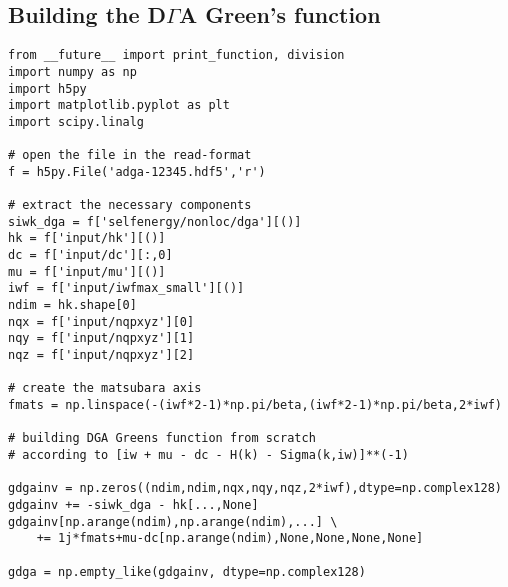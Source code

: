 \documentclass[a4paper,11pt]{article}
\numberwithin{equation}{section} %
\begin{document}
\newpage
\subsection*{Building the D$\Gamma$A Green's function}
\begin{verbatim}
from __future__ import print_function, division
import numpy as np
import h5py
import matplotlib.pyplot as plt
import scipy.linalg

# open the file in the read-format
f = h5py.File('adga-12345.hdf5','r')

# extract the necessary components
siwk_dga = f['selfenergy/nonloc/dga'][()]
hk = f['input/hk'][()]
dc = f['input/dc'][:,0]
mu = f['input/mu'][()]
iwf = f['input/iwfmax_small'][()]
ndim = hk.shape[0]
nqx = f['input/nqpxyz'][0]
nqy = f['input/nqpxyz'][1]
nqz = f['input/nqpxyz'][2]

# create the matsubara axis
fmats = np.linspace(-(iwf*2-1)*np.pi/beta,(iwf*2-1)*np.pi/beta,2*iwf)

# building DGA Greens function from scratch 
# according to [iw + mu - dc - H(k) - Sigma(k,iw)]**(-1)                                                                                               

gdgainv = np.zeros((ndim,ndim,nqx,nqy,nqz,2*iwf),dtype=np.complex128)                                                                                                                                                                                                                                                                                                                           
gdgainv += -siwk_dga - hk[...,None]                                                                                                                                                                 
gdgainv[np.arange(ndim),np.arange(ndim),...] \
	+= 1j*fmats+mu-dc[np.arange(ndim),None,None,None,None]                                                                                                            
                                                                                                                                                                                                               
gdga = np.empty_like(gdgainv, dtype=np.complex128)                                                                                                                                                             
                                                                                                                                                                                                               

\end{verbatim}
\end{document}
